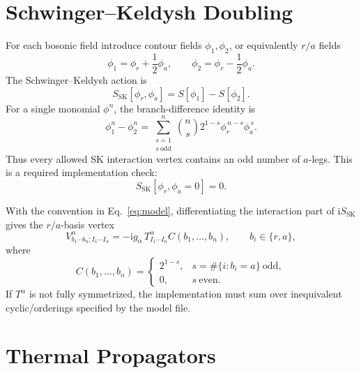 \documentclass[11pt]{article}
\newcommand{\ii}{\mathrm{i}}
\newcommand{\SK}{\mathrm{SK}}
\begin{document}
\section{Schwinger--Keldysh Doubling}

For each bosonic field introduce contour fields \(\phi_1,\phi_2\), or
equivalently \(r/a\) fields
\begin{equation}
  \phi_1 = \phi_r + \frac{1}{2}\phi_a,
  \qquad
  \phi_2 = \phi_r - \frac{1}{2}\phi_a .
  \label{eq:ra-map}
\end{equation}
The Schwinger--Keldysh action is
\begin{equation}
  S_{\SK}[\phi_r,\phi_a]
  =
  S[\phi_1] - S[\phi_2].
  \label{eq:sk-action}
\end{equation}
For a single monomial \(\phi^n\), the branch-difference identity is
\begin{equation}
  \phi_1^n-\phi_2^n
  =
  \sum_{\substack{s=1\\s\ \mathrm{odd}}}^{n}
  \binom{n}{s}2^{1-s}
  \phi_r^{\,n-s}\phi_a^{\,s}.
  \label{eq:branch-difference}
\end{equation}
Thus every allowed SK interaction vertex contains an odd number of \(a\)-legs.
This is a required implementation check:
\begin{equation}
  S_{\SK}[\phi_r,\phi_a=0]=0.
  \label{eq:unitarity-check}
\end{equation}

With the convention in Eq.~\eqref{eq:model}, differentiating the interaction
part of \(\ii S_{\SK}\) gives the \(r/a\)-basis vertex
\begin{equation}
  V^\alpha_{b_1\cdots b_n;I_1\cdots I_n}
  =
  -\ii g_\alpha\,
  T^\alpha_{I_1\cdots I_n}
  C(b_1,\ldots,b_n),
  \qquad b_i\in\{r,a\},
  \label{eq:sk-vertex}
\end{equation}
where
\begin{equation}
  C(b_1,\ldots,b_n)
  =
  \begin{cases}
    2^{1-s}, & s=\#\{i:b_i=a\}\ \mathrm{odd},\\
    0,       & s\ \mathrm{even}.
  \end{cases}
  \label{eq:vertex-coefficient}
\end{equation}
If \(T^\alpha\) is not fully symmetrized, the implementation must sum over
inequivalent cyclic/orderings specified by the model file.

\section{Thermal Propagators}
\end{document}
